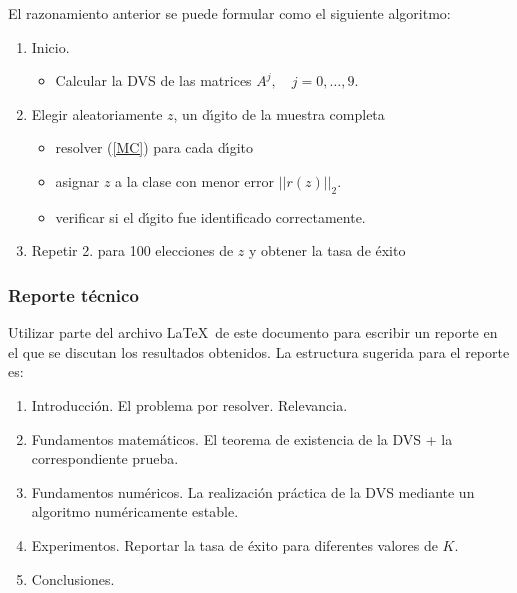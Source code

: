 \documentclass[12pt]{article}
\begin{document}
El razonamiento anterior se puede formular como el siguiente algoritmo:
\begin{enumerate}
 \item Inicio. 
       \begin{itemize}
         \item Calcular la DVS de las matrices $A^j, \quad j=0, \ldots, 9$.
       \end{itemize}
 \item Elegir aleatoriamente $z$, un d\'{\i}gito de la muestra completa
       \begin{itemize}
         \item resolver (\ref{MC}) para cada d\'{\i}gito
         \item asignar  $z$ a la clase con menor error $||r(z)||_2$.
         \item verificar si el d\'{\i}gito fue identificado correctamente.
       \end{itemize}
 \item Repetir 2. para 100 elecciones de $z$ y obtener la tasa de \'exito
\end{enumerate}

\subsubsection*{Reporte t\'ecnico}

 Utilizar parte del archivo \LaTeX \, de este documento para escribir un reporte en el que se discutan los resultados obtenidos. La estructura sugerida para el reporte es:
 \begin{enumerate}
  \item Introducci\'on. El problema por resolver. Relevancia.
  \item Fundamentos matem\'aticos. El teorema de existencia de la DVS + la correspondiente prueba.
  \item Fundamentos num\'ericos. La realizaci\'on pr\'actica de la DVS mediante un algoritmo  num\'ericamente estable.
  \item Experimentos. Reportar la tasa de \'exito para diferentes valores de $K$. 
  \item Conclusiones.
 \end{enumerate}


\enddocument
\end{document}
